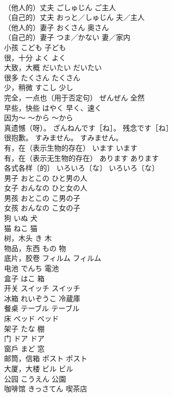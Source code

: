 \documentclass[8pt]{extreport}
\begin{document}
\begin{CJK}{UTF8}{min}
\\	（他人的）丈夫	ごしゅじん	ご主人
\\	（自己的）丈夫	おっと／しゅじん	夫／主人
\\	（他人的）妻子	おくさん	奥さん
\\	（自己的）妻子	つま／かない	妻／家内
\\	小孩	こども	子ども
\\	很，十分	よく	よく
\\	大致，大概	だいたい	だいたい
\\	很多	たくさん	たくさん
\\	少，稍微	すこし	少し
\\	完全，一点也（用于否定句）	ぜんぜん	全然
\\	早些，快些	はやく	早く、速く
\\	因为～	～から	～から
\\	真遗憾（呀）。	ざんねんです［ね］。	残念です［ね］
\\	很抱歉。	すみません。	すみません。
\\	有，在（表示生物的存在）	います	います
\\	有，在（表示无生物的存在）	あります	あります
\\	各式各样〔的〕	いろいろ〔な〕	いろいろ〔な〕
\\	男子	おとこの	ひと男の人
\\	女子	おんなの	ひと女の人
\\	男孩	おとこの	こ男の子
\\	女孩	おんなの	こ女の子
\\	狗	いぬ	犬
\\	猫	ねこ	猫
\\	树，木头	き	木
\\	物品，东西	もの	物
\\	底片，胶卷	フィルム	フィルム
\\	电池	でんち	電池
\\	盒子	はこ	箱
\\	开关	スイッチ	スイッチ
\\	冰箱	れいぞうこ	冷蔵庫
\\	餐桌	テーブル	テーブル
\\	床	べッド	べッド
\\	架子	たな	棚
\\	门	ドア	ドア
\\	窗戶	まど	窓
\\	邮筒，信箱	ポスト	ポスト
\\	大厦，大楼	ビル	ビル
\\	公园	こうえん	公園
\\	咖啡馆	きっさてん	喫茶店

\end{CJK}
\end{document}

